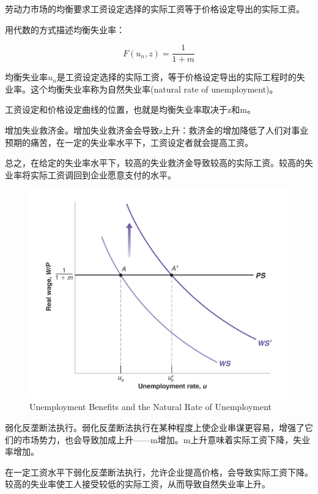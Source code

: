 \documentclass{article}
\begin{document}
劳动力市场的均衡要求工资设定选择的实际工资等于价格设定导出的实际工资。

用代数的方式描述均衡失业率：

\[
F(u_n,z)=\frac{1}{1+m}
\]

均衡失业率$ u_n $是工资设定选择的实际工资，等于价格设定导出的实际工程时的失业率。这个均衡失业率称为自然失业率(natural rate of unemployment)。

工资设定和价格设定曲线的位置，也就是均衡失业率取决于z和m。

增加失业救济金。增加失业救济金会导致z上升：救济金的增加降低了人们对事业预期的痛苦，在一定的失业率水平下，工资设定者就会提高工资。

总之，在给定的失业率水平下，较高的失业救济金导致较高的实际工资。较高的失业率将实际工资调回到企业愿意支付的水平。

\begin{figure}[H] %
	\centering %
	\includegraphics[width=1\textwidth]{7_3} %
	\caption{Unemployment Benefits
		and the Natural Rate of
		Unemployment} %
	\label{Fig.main4} %
\end{figure}

弱化反垄断法执行。弱化反垄断法执行在某种程度上使企业串谋更容易，增强了它们的市场势力，也会导致加成上升——m增加。m上升意味着实际工资下降，失业率增加。

在一定工资水平下弱化反垄断法执行，允许企业提高价格，会导致实际工资下降。较高的失业率使工人接受较低的实际工资，从而导致自然失业率上升。
\end{document}
